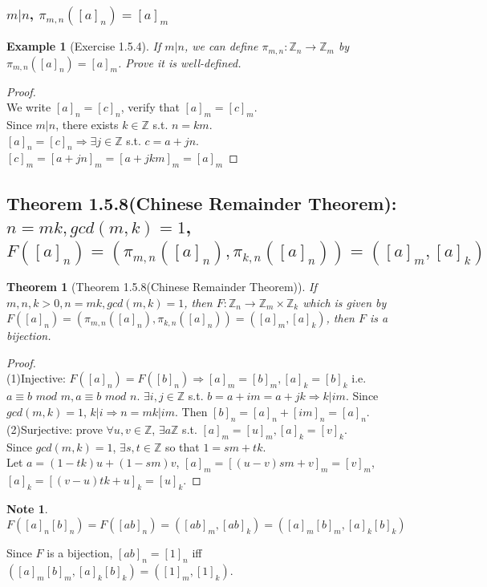 \documentclass[11pt,a4paper]{article}
\newtheorem{theorem}{Theorem}
\newtheorem{example}{Example}
\newtheorem{note}{Note}
\begin{document}
\subsubsection{$m|n$, $\pi_{m,n}([a]_n)=[a]_m$}
\begin{example}[Exercise 1.5.4]
    If $m|n$, we can define $\pi_{m,n}:\mathbb{Z}_n\rightarrow\mathbb{Z}_m$ by $\pi_{m,n}([a]_n)=[a]_m$. Prove it is well-defined.
\end{example}
\begin{proof}
\quad\\
We write $[a]_n=[c]_n$, verify that $[a]_m=[c]_m$.\\
Since $m|n$, there exists $k\in\mathbb{Z}$ s.t. $n=km$.\\
$[a]_n=[c]_n\Rightarrow \exists j\in\mathbb{Z}$ s.t. $c=a+jn$.\\
$[c]_m=[a+jn]_m=[a+jkm]_m=[a]_m$
\end{proof}

\subsection{Theorem 1.5.8(Chinese Remainder Theorem): $n=mk,gcd(m,k)=1$, $F([a]_n)=(\pi_{m,n}([a]_n),\pi_{k,n}([a]_n))=([a]_m,[a]_k)$}
\begin{theorem}[Theorem 1.5.8(Chinese Remainder Theorem)]
If $m,n,k>0,n=mk,gcd(m,k)=1$, then $F:\mathbb{Z}_n\rightarrow\mathbb{Z}_m\times\mathbb{Z}_k$ which is given by $F([a]_n)=(\pi_{m,n}([a]_n),\pi_{k,n}([a]_n))=([a]_m,[a]_k)$, then $F$ is a bijection.
\end{theorem}
\begin{proof}
\quad\\
(1)Injective: $F([a]_n)=F([b]_n)\Rightarrow [a]_m=[b]_m,[a]_k=[b]_k$ i.e. $a\equiv b \textit{ mod }m,a\equiv b \textit{ mod }n$. $\exists i,j\in\mathbb{Z}$ s.t. $b=a+im=a+jk\Rightarrow k|im$. Since $gcd(m,k)=1$, $k|i\Rightarrow n=mk|im$. Then $[b]_n=[a]_n+[im]_n=[a]_n$.\\
(2)Surjective: prove $\forall u,v\in\mathbb{Z}$, $\exists a\mathbb{Z}$ s.t. $[a]_m=[u]_m,[a]_k=[v]_k$.\\
Since $gcd(m,k)=1$, $\exists s,t\in \mathbb{Z}$ so that $1=sm+tk$. \\
Let $a=(1-tk)u+(1-sm)v$, $[a]_m=[(u-v)sm+v]_m=[v]_m$, $[a]_k=[(v-u)tk+u]_k=[u]_k$.
\end{proof}
\begin{note}
    $F([a]_n[b]_n)=F([ab]_n)=([ab]_m,[ab]_k)=([a]_m[b]_m,[a]_k[b]_k)$
\end{note}
Since $F$ is a bijection, $[ab]_n=[1]_n$ iff $([a]_m[b]_m,[a]_k[b]_k)=([1]_m,[1]_k)$.
\end{document}
